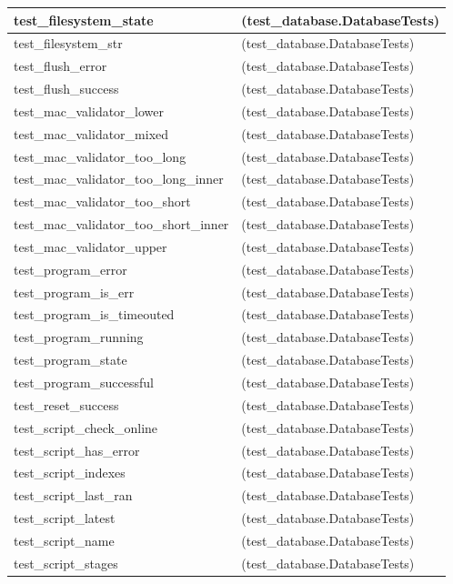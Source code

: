 \begin{longtable}{|p{10cm}|p{7cm}|}
test\_filesystem\_state & (test\_database.DatabaseTests)\\\hline
test\_filesystem\_str & (test\_database.DatabaseTests)\\\hline
test\_flush\_error & (test\_database.DatabaseTests)\\\hline
test\_flush\_success & (test\_database.DatabaseTests)\\\hline
test\_mac\_validator\_lower & (test\_database.DatabaseTests)\\\hline
test\_mac\_validator\_mixed & (test\_database.DatabaseTests)\\\hline
test\_mac\_validator\_too\_long & (test\_database.DatabaseTests)\\\hline
test\_mac\_validator\_too\_long\_inner & (test\_database.DatabaseTests)\\\hline
test\_mac\_validator\_too\_short & (test\_database.DatabaseTests)\\\hline
test\_mac\_validator\_too\_short\_inner & (test\_database.DatabaseTests)\\\hline
test\_mac\_validator\_upper & (test\_database.DatabaseTests)\\\hline
test\_program\_error & (test\_database.DatabaseTests)\\\hline
test\_program\_is\_err & (test\_database.DatabaseTests)\\\hline
test\_program\_is\_timeouted & (test\_database.DatabaseTests)\\\hline
test\_program\_running & (test\_database.DatabaseTests)\\\hline
test\_program\_state & (test\_database.DatabaseTests)\\\hline
test\_program\_successful & (test\_database.DatabaseTests)\\\hline
test\_reset\_success & (test\_database.DatabaseTests)\\\hline
test\_script\_check\_online & (test\_database.DatabaseTests)\\\hline
test\_script\_has\_error & (test\_database.DatabaseTests)\\\hline
test\_script\_indexes & (test\_database.DatabaseTests)\\\hline
test\_script\_last\_ran & (test\_database.DatabaseTests)\\\hline
test\_script\_latest & (test\_database.DatabaseTests)\\\hline
test\_script\_name & (test\_database.DatabaseTests)\\\hline
test\_script\_stages & (test\_database.DatabaseTests)\\\hline

\end{longtable}
